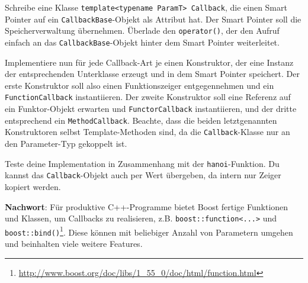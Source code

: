 Schreibe eine Klasse \lstinline{template<typename ParamT> Callback}, die einen Smart Pointer auf ein \lstinline{CallbackBase}-Objekt als Attribut hat. Der Smart Pointer soll die Speicherverwaltung übernehmen. Überlade den \lstinline{operator()}, der den Aufruf einfach an das \lstinline{CallbackBase}-Objekt hinter dem Smart Pointer weiterleitet.

Implementiere nun für jede Callback-Art je einen Konstruktor, der eine Instanz der entsprechenden Unterklasse erzeugt und in dem Smart Pointer speichert.
Der erste Konstruktor soll also einen Funktionszeiger entgegennehmen und ein \lstinline{FunctionCallback} instantiieren.
Der zweite Konstruktor soll eine Referenz auf ein Funktor-Objekt erwarten und  \lstinline{FunctorCallback} instantiieren, und der dritte entsprechend ein \lstinline{MethodCallback}.
Beachte, dass die beiden letztgenannten Konstruktoren selbst Template-Methoden sind, da die \lstinline{Callback}-Klasse nur an den Parameter-Typ gekoppelt ist.

Teste deine Implementation in Zusammenhang mit der \lstinline{hanoi}-Funktion. Du kannst das \lstinline{Callback}-Objekt auch per Wert übergeben, da intern nur Zeiger kopiert werden.


\textbf{Nachwort}:
Für produktive C++-Programme bietet Boost fertige Funktionen und Klassen, um Callbacks zu realisieren, z.B. \lstinline{boost::function<...>} und \lstinline{boost::bind()}\footnote{\url{http://www.boost.org/doc/libs/1_55_0/doc/html/function.html}}. Diese können mit beliebiger Anzahl von Parametern umgehen und beinhalten viele weitere Features.
